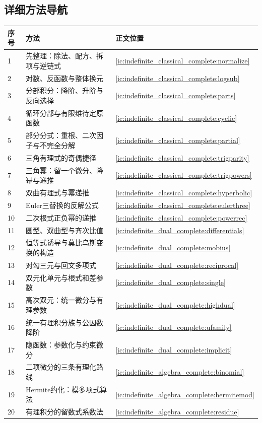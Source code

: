 \subsection{详细方法导航}
\begin{longtable}{p{9mm}p{91mm}p{23mm}}\toprule 序号&方法&正文位置\\\midrule\endhead
1&先整理：除法、配方、拆项与逆链式&\ref{ic:indefinite_classical_complete:normalize}\\
2&对数、反函数与整体换元&\ref{ic:indefinite_classical_complete:logsub}\\
3&分部积分：降阶、升阶与反向选择&\ref{ic:indefinite_classical_complete:parts}\\
4&循环分部与有限维待定原函数&\ref{ic:indefinite_classical_complete:cyclic}\\
5&部分分式：重根、二次因子与不完全分解&\ref{ic:indefinite_classical_complete:partial}\\
6&三角有理式的奇偶捷径&\ref{ic:indefinite_classical_complete:trigparity}\\
7&三角幂：留一个微分、降幂与递推&\ref{ic:indefinite_classical_complete:trigpowers}\\
8&双曲有理式与幂递推&\ref{ic:indefinite_classical_complete:hyperbolic}\\
9&Euler三替换的反解公式&\ref{ic:indefinite_classical_complete:eulerthree}\\
10&二次根式正负幂的递推&\ref{ic:indefinite_classical_complete:powerrec}\\
11&圆型、双曲型与齐次比值&\ref{ic:indefinite_dual_complete:differentials}\\
12&恒等式诱导与莫比乌斯变换的构造&\ref{ic:indefinite_dual_complete:mobius}\\
13&对勾三元与回文多项式&\ref{ic:indefinite_dual_complete:reciprocal}\\
14&双元化单元与根式和差参数&\ref{ic:indefinite_dual_complete:single}\\
15&高次双元：统一微分与有理参数&\ref{ic:indefinite_dual_complete:highdual}\\
16&统一有理积分族与公因数降阶&\ref{ic:indefinite_dual_complete:ufamily}\\
17&隐函数：参数化与约束微分&\ref{ic:indefinite_dual_complete:implicit}\\
18&二项微分的三条有理化路线&\ref{ic:indefinite_algebra_complete:binomial}\\
19&Hermite约化：模多项式算法&\ref{ic:indefinite_algebra_complete:hermitemod}\\
20&有理积分的留数式系数法&\ref{ic:indefinite_algebra_complete:residue}\\

\end{longtable}
